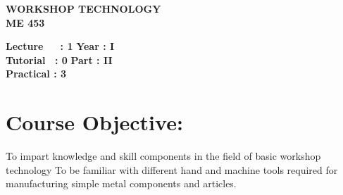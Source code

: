 \begin{center}
    \textbf{\huge{\uppercase{Workshop Technology}}}
    \\
    \vspace{.5cm}
    \textbf{\large{ME 453}}
\end{center}

\noindent\textbf{Lecture\ \ \ : 1} \hfill \textbf{Year : I } \\
\textbf{Tutorial \ : 0} \hfill \textbf{Part : II } \\
\textbf{Practical : 3}  \\

\par
\noindent 
\section*{Course Objective:}
To impart knowledge and skill components in the field of basic workshop technology To be familiar with different hand and machine tools required for manufacturing simple metal components and articles.


